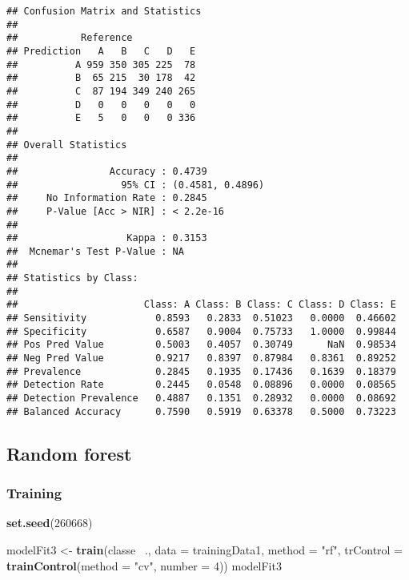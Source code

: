 \documentclass[]{article}
\newenvironment{Shaded}{\begin{snugshade}}{\end{snugshade}}
\newcommand{\KeywordTok}[1]{\textcolor[rgb]{0.13,0.29,0.53}{\textbf{{#1}}}}
\newcommand{\DataTypeTok}[1]{\textcolor[rgb]{0.13,0.29,0.53}{{#1}}}
\newcommand{\DecValTok}[1]{\textcolor[rgb]{0.00,0.00,0.81}{{#1}}}
\newcommand{\StringTok}[1]{\textcolor[rgb]{0.31,0.60,0.02}{{#1}}}
\newcommand{\NormalTok}[1]{{#1}}
\begin{document}
\begin{verbatim}
## Confusion Matrix and Statistics
## 
##           Reference
## Prediction   A   B   C   D   E
##          A 959 350 305 225  78
##          B  65 215  30 178  42
##          C  87 194 349 240 265
##          D   0   0   0   0   0
##          E   5   0   0   0 336
## 
## Overall Statistics
##                                           
##                Accuracy : 0.4739          
##                  95% CI : (0.4581, 0.4896)
##     No Information Rate : 0.2845          
##     P-Value [Acc > NIR] : < 2.2e-16       
##                                           
##                   Kappa : 0.3153          
##  Mcnemar's Test P-Value : NA              
## 
## Statistics by Class:
## 
##                      Class: A Class: B Class: C Class: D Class: E
## Sensitivity            0.8593   0.2833  0.51023   0.0000  0.46602
## Specificity            0.6587   0.9004  0.75733   1.0000  0.99844
## Pos Pred Value         0.5003   0.4057  0.30749      NaN  0.98534
## Neg Pred Value         0.9217   0.8397  0.87984   0.8361  0.89252
## Prevalence             0.2845   0.1935  0.17436   0.1639  0.18379
## Detection Rate         0.2445   0.0548  0.08896   0.0000  0.08565
## Detection Prevalence   0.4887   0.1351  0.28932   0.0000  0.08692
## Balanced Accuracy      0.7590   0.5919  0.63378   0.5000  0.73223
\end{verbatim}

\subsection{Random forest}\label{random-forest}

\subsubsection{Training}\label{training-1}

\begin{Shaded}
\begin{Highlighting}[]
\KeywordTok{set.seed}\NormalTok{(}\DecValTok{260668}\NormalTok{)}

\NormalTok{modelFit3 <-}\StringTok{ }\KeywordTok{train}\NormalTok{(classe ~., }\DataTypeTok{data =} \NormalTok{trainingData1,}
                  \DataTypeTok{method =} \StringTok{"rf"}\NormalTok{,}
                  \DataTypeTok{trControl =} \KeywordTok{trainControl}\NormalTok{(}\DataTypeTok{method =} \StringTok{"cv"}\NormalTok{, }\DataTypeTok{number =} \DecValTok{4}\NormalTok{))}
\NormalTok{modelFit3}
\end{Highlighting}
\end{Shaded}
\end{document}
